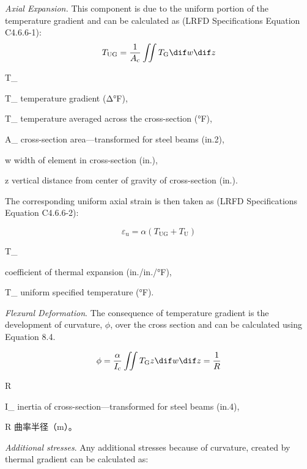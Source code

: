 \emph{Axial Expansion.} This component is due to the uniform portion of the temperature gradient and can be calculated
as (LRFD Specifications Equation C4.6.6-1):
\begin{equation}
  T_\text{UG} = \frac{1}{A_\text{c}} \iint T_\text{G} \dif w \dif z
\end{equation}
\begin{EqDesc}{T_}
  \item [T_\text{G}] temperature gradient (Δ°F),
  \item [T_\text{UG}] temperature averaged across the cross-section (°F),
  \item [A_\text{c}] cross-section area—transformed for steel beams (in.2),
  \item [w] width of element in cross-section (in.),
  \item [z] vertical distance from center of gravity of cross-section (in.).
\end{EqDesc}

The corresponding uniform axial strain is then taken as (LRFD Specifications Equation C4.6.6-2):

\begin{equation}
 \varepsilon_\text{u} = \alpha (T_\text{UG} + T_\text{U})
\end{equation}
\begin{EqDesc}{T_}
  \item[\alpha] coefficient of thermal expansion (in./in./°F),
  \item[T_\text{U}] uniform specified temperature (°F).
\end{EqDesc}

\emph{Flexural Deformation}. The consequence of temperature gradient is the development of curvature, $\phi$, over the cross section and can be calculated using Equation 8.4.

\begin{equation}
  \phi = \frac{\alpha}{I_\text{c}} \iint T_\text{G} z \dif w \dif z =\frac{1}{R}
\end{equation}
\begin{EqDesc}{R}
  \item[I_\text{c}] inertia of cross-section—transformed for steel beams (in.4),
  \item[R] 曲率半径（\unit{m}）。
\end{EqDesc}

\emph{Additional stresses}. Any additional stresses because of curvature, created by thermal gradient can be calculated as:

